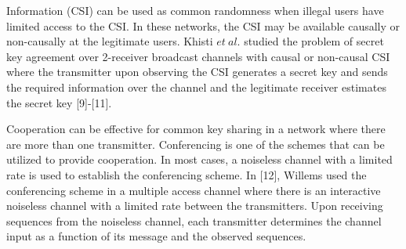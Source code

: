 \documentclass[conference,8pt]{IEEEtran}
\begin{document}
Information (CSI) can be used as common randomness when illegal users have limited access to the CSI. In these networks, the CSI may be available causally or non-causally at the legitimate users. Khisti $et \ al.$ studied the  problem of secret key agreement over 2-receiver broadcast channels with causal or non-causal CSI where the transmitter upon observing the CSI generates a secret key and sends the required information over the channel and the legitimate receiver estimates the secret key  [9]-[11]. 

Cooperation can be effective for common key sharing in a network where there are more than one transmitter. Conferencing is one of the schemes that can be utilized to provide cooperation. In most cases, a noiseless channel with a limited rate is used to establish the conferencing scheme. In [12], Willems used the conferencing scheme in a multiple access channel where there is an interactive noiseless channel with a limited rate between the transmitters. Upon receiving sequences from the noiseless channel, each transmitter determines the channel input as a function of its message and the observed sequences.
\vspace{-1mm}
\end{document}
